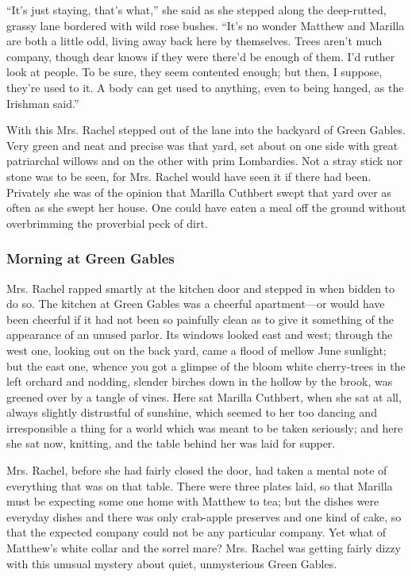 \documentclass{article}
\begin{document}
``It's just staying, that's what,'' she said as she stepped along the deep-rutted, grassy lane bordered with wild rose bushes. ``It's no wonder Matthew and Marilla are both a little odd, living away back here by themselves. Trees aren't much company, though dear knows if they were there'd be enough of them. I'd ruther look at people. To be sure, they seem contented enough; but then, I suppose, they're used to it. A body can get used to anything, even to being hanged, as the Irishman said.''

With this Mrs. Rachel stepped out of the lane into the backyard of Green Gables. Very green and neat and precise was that yard, set about on one side with great patriarchal willows and on the other with prim Lombardies. Not a stray stick nor stone was to be seen, for Mrs. Rachel would have seen it if there had been. Privately she was of the opinion that Marilla Cuthbert swept that yard over as often as she swept her house. One could have eaten a meal off the ground without overbrimming the proverbial peck of dirt.

\subsubsection{Morning at Green Gables}
Mrs. Rachel rapped smartly at the kitchen door and stepped in when bidden to do so. The kitchen at Green Gables was a cheerful apartment---or would have been cheerful if it had not been so painfully clean as to give it something of the appearance of an unused parlor. Its windows looked east and west; through the west one, looking out on the back yard, came a flood of mellow June sunlight; but the east one, whence you got a glimpse of the bloom white cherry-trees in the left orchard and nodding, slender birches down in the hollow by the brook, was greened over by a tangle of vines. Here sat Marilla Cuthbert, when she sat at all, always slightly distrustful of sunshine, which seemed to her too dancing and irresponsible a thing for a world which was meant to be taken seriously; and here she sat now, knitting, and the table behind her was laid for supper.

Mrs. Rachel, before she had fairly closed the door, had taken a mental note of everything that was on that table. There were three plates laid, so that Marilla must be expecting some one home with Matthew to tea; but the dishes were everyday dishes and there was only crab-apple preserves and one kind of cake, so that the expected company could not be any particular company. Yet what of Matthew's white collar and the sorrel mare? Mrs. Rachel was getting fairly dizzy with this unusual mystery about quiet, unmysterious Green Gables.
\end{document}
